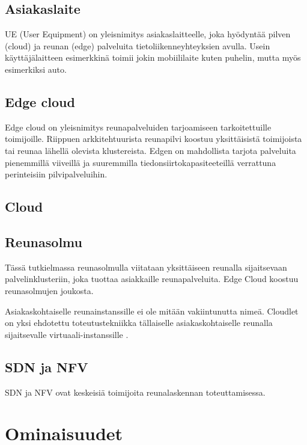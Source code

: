 \documentclass[finnish]{tktltiki2}
\theoremstyle{definition}
\theoremstyle{remark}
\begin{document}
\subsection{Asiakaslaite}
UE (User Equipment) on yleisnimitys asiakaslaitteelle, joka hyödyntää pilven (cloud) ja reunan (edge) palveluita tietoliikenneyhteyksien avulla.
Usein käyttäjälaitteen esimerkkinä toimii jokin mobiililaite kuten puhelin, mutta myös esimerkiksi auto. 

\subsection{Edge cloud}
Edge cloud on yleisnimitys reunapalveluiden tarjoamiseen tarkoitettuille toimijoille.
Riippuen arkkitehtuurista reunapilvi koostuu yksittäisistä toimijoista tai reunaa lähellä olevista klustereista.
Edgen on mahdollista tarjota palveluita pienemmillä viiveillä ja suuremmilla tiedonsiirtokapasiteeteillä verrattuna perinteisiin pilvipalveluihin. 

\subsection{Cloud}

\subsection{Reunasolmu}
Tässä tutkielmassa reunasolmulla viitataan yksittäiseen reunalla sijaitsevaan
palvelinklusteriin, joka tuottaa asiakkaille reunapalveluita. Edge Cloud koostuu reunasolmujen joukosta.

Asiakaskohtaiselle reunainstanssille ei ole mitään vakiintunutta nimeä.
Cloudlet on yksi ehdotettu toteutustekniikka tällaiselle asiakaskohtaiselle reunalla sijaitsevalle virtuaali-instanssille \cite{satya09}.

\subsection{SDN ja NFV}
SDN ja NFV ovat keskeisiä toimijoita reunalaskennan toteuttamisessa.

\section{Ominaisuudet}
\end{document}
